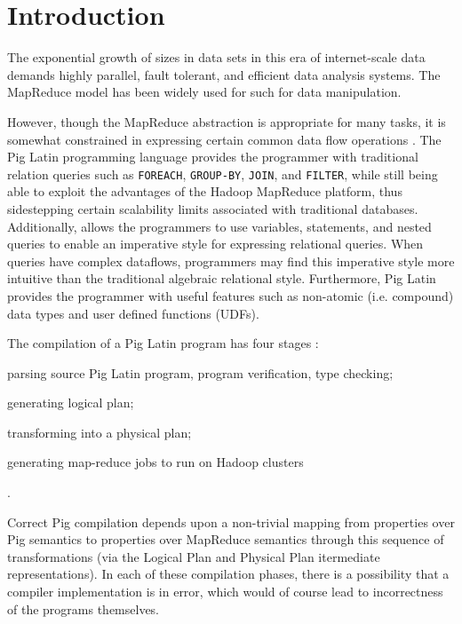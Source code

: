 \section{Introduction}
\label{sec:intro}

{\bf}

The exponential growth of sizes in data sets in this era of internet-scale data demands highly parallel, fault tolerant, and efficient data analysis systems. The MapReduce model \cite{dean2004mapreduce} \cite{dean2010mapreduce} has been widely used for such for data manipulation.

However, though the MapReduce abstraction is appropriate for many tasks, it is somewhat constrained in expressing certain common data flow operations \cite{olston2008pig}. The Pig Latin programming language \cite{olston2008pig} provides the programmer with traditional relation queries such as \texttt{FOREACH}, \texttt{GROUP-BY}, \texttt{JOIN}, and \texttt{FILTER}, while
still being able to exploit the advantages of the Hadoop MapReduce platform, thus sidestepping certain scalability limits associated with traditional databases. Additionally, allows the programmers to use variables, statements, and nested queries to enable an imperative style for expressing relational queries. When queries have complex dataflows, programmers may find this imperative style more intuitive than the traditional algebraic relational style. Furthermore, Pig Latin provides the programmer with useful features such as non-atomic (i.e. compound) data types and user defined functions (UDFs).

The compilation of a Pig Latin program has four stages \cite{gates2009building}: \begin{enumerate*}[label=\itshape\alph*\upshape)] \item parsing source Pig Latin program, program verification, type checking; \item generating logical plan; \item transforming into a physical plan; \item generating map-reduce jobs to run on Hadoop clusters \end{enumerate*}.

Correct Pig compilation depends upon a non-trivial mapping from properties over Pig semantics to properties over MapReduce semantics through this sequence of transformations (via the Logical Plan and Physical Plan itermediate representations). In each of these compilation phases, there is a possibility that a compiler implementation is in error, which would of course lead to incorrectness of the programs themselves.

